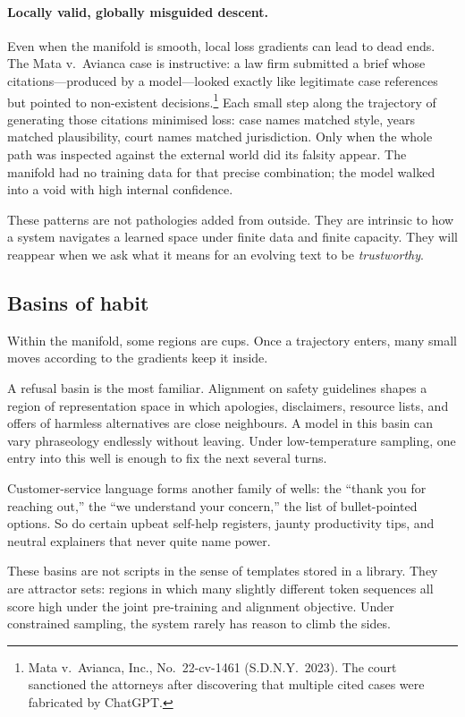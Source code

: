 \paragraph{Locally valid, globally misguided descent.} Even when the manifold is smooth, local loss gradients can lead to dead ends. The Mata v.\ Avianca case is instructive: a law firm submitted a brief whose citations---produced by a model---looked exactly like legitimate case references but pointed to non-existent decisions.\footnote{Mata v.\ Avianca, Inc., No.\ 22-cv-1461 (S.D.N.Y.\ 2023). The court sanctioned the attorneys after discovering that multiple cited cases were fabricated by ChatGPT.} Each small step along the trajectory of generating those citations minimised loss: case names matched style, years matched plausibility, court names matched jurisdiction. Only when the whole path was inspected against the external world did its falsity appear. The manifold had no training data for that precise combination; the model walked into a void with high internal confidence.

These patterns are not pathologies added from outside. They are intrinsic to how a system navigates a learned space under finite data and finite capacity. They will reappear when we ask what it means for an evolving text to be \emph{trustworthy}.

\subsection*{Basins of habit}

Within the manifold, some regions are cups. Once a trajectory enters, many small moves according to the gradients keep it inside.

A refusal basin is the most familiar. Alignment on safety guidelines shapes a region of representation space in which apologies, disclaimers, resource lists, and offers of harmless alternatives are close neighbours. A model in this basin can vary phraseology endlessly without leaving. Under low-temperature sampling, one entry into this well is enough to fix the next several turns.

Customer-service language forms another family of wells: the ``thank you for reaching out,'' the ``we understand your concern,'' the list of bullet-pointed options. So do certain upbeat self-help registers, jaunty productivity tips, and neutral explainers that never quite name power.

These basins are not scripts in the sense of templates stored in a library. They are attractor sets: regions in which many slightly different token sequences all score high under the joint pre-training and alignment objective. Under constrained sampling, the system rarely has reason to climb the sides.


